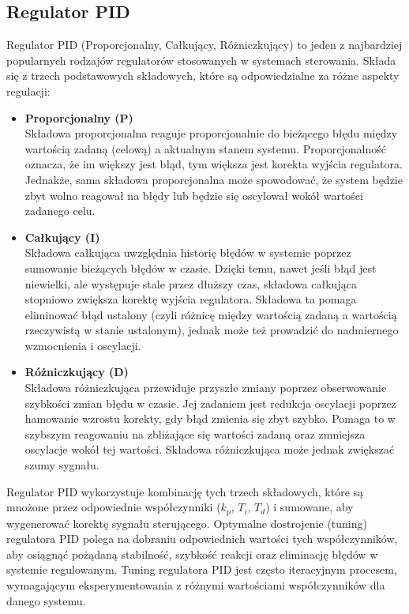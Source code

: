 \documentclass[12pt,a4paper]{article}
\begin{document}
	\subsection{Regulator PID}
 	Regulator PID (Proporcjonalny, Całkujący, Różniczkujący) to jeden z najbardziej popularnych rodzajów regulatorów stosowanych w systemach sterowania. Składa się z trzech podstawowych składowych, które są odpowiedzialne za różne aspekty regulacji: \\
  	\begin{itemize}
		\item \textbf{Proporcjonalny (P)} \\ Składowa proporcjonalna reaguje proporcjonalnie do bieżącego błędu między wartością zadaną (celową) a aktualnym stanem systemu. Proporcjonalność oznacza, że im większy jest błąd, tym większa jest korekta wyjścia regulatora. Jednakże, sama składowa proporcjonalna może spowodować, że system będzie zbyt wolno reagował na błędy lub będzie się oscylował wokół wartości zadanego celu. \\
		\item \textbf{Całkujący (I)} \\ Składowa całkująca uwzględnia historię błędów w systemie poprzez sumowanie bieżących błędów w czasie. Dzięki temu, nawet jeśli błąd jest niewielki, ale występuje stale przez dłuższy czas, składowa całkująca stopniowo zwiększa korektę wyjścia regulatora. Składowa ta pomaga eliminować błąd ustalony (czyli różnicę między wartością zadaną a wartością rzeczywistą w stanie ustalonym), jednak może też prowadzić do nadmiernego wzmocnienia i oscylacji. \\
  		\item \textbf{Różniczkujący (D)} \\ Składowa różniczkująca przewiduje przyszłe zmiany poprzez obserwowanie szybkości zmian błędu w czasie. Jej zadaniem jest redukcja oscylacji poprzez hamowanie wzrostu korekty, gdy błąd zmienia się zbyt szybko. Pomaga to w szybszym reagowaniu na zbliżające się wartości zadaną oraz zmniejsza oscylacje wokół tej wartości. Składowa różniczkująca może jednak zwiększać szumy sygnału.\\
	\end{itemize}
 	Regulator PID wykorzystuje kombinację tych trzech składowych, które są mnożone przez odpowiednie współczynniki ($k_p$, $T_i$, $T_d$) i sumowane, aby wygenerować korektę sygnału sterującego. Optymalne dostrojenie (tuning) regulatora PID polega na dobraniu odpowiednich wartości tych współczynników, aby osiągnąć pożądaną stabilność, szybkość reakcji oraz eliminację błędów w systemie regulowanym. Tuning regulatora PID jest często iteracyjnym procesem, wymagającym eksperymentowania z różnymi wartościami współczynników dla danego systemu. \\
\end{document}
